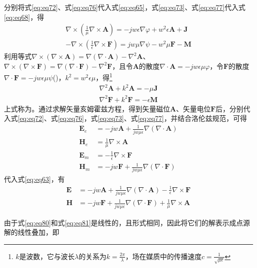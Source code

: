 \documentclass{article}
\numberwithin{equation}{section}
\begin{document}
分别将式\ref{eq:eq72}、式\ref{eq:eq76}代入式\ref{eq:eq65}，式\ref{eq:eq73}、式\ref{eq:eq77}代入式\ref{eq:eq68}，得
\begin{align}
    \label{eq:eq78}
    \nabla \times (\frac{1}{\mu}\nabla\times \mathbf{A})=-jw\epsilon \nabla \varphi+w^2\epsilon\mathbf{A}+\mathbf{J} \\
    \label{eq:eq79}
    -\nabla \times (\frac{1}{\epsilon}\nabla\times \mathbf{F})=jw\mu \nabla \psi-w^2\mu\mathbf{F}-\mathbf{M}
\end{align}
利用等式$\nabla\times(\nabla\times\mathbf{A})=\nabla(\nabla \cdot\mathbf{A})-\nabla^2\mathbf{A}$、$\nabla\times(\nabla\times\mathbf{F})=\nabla(\nabla \cdot\mathbf{F})-\nabla^2\mathbf{F}$，且令$\mathbf{A}$的散度$\nabla\cdot\mathbf{A}=-jw\epsilon\mu\varphi$，令$\mathbf{F}$的散度$\nabla\cdot\mathbf{F}=-jw\epsilon\mu\psi$(\textbf{\color{blue}{洛伦兹规范}})，$k^2=w^2\epsilon\mu$，得\footnote{$k$是波数，它与波长$\lambda$的关系为$k=\frac{2\pi}{\lambda}$，场在媒质中的传播速度$c=\frac{1}{\sqrt{\mu\epsilon}}$}
\begin{align}
    \label{eq:eq80}
    \nabla^2\mathbf{A}+k^2\mathbf{A}=-\mu\mathbf{J} \\
    \label{eq:eq81}
    \nabla^2\mathbf{F}+k^2\mathbf{F}=-\epsilon\mathbf{M}
\end{align}
上式称为\textbf{\color{blue}{矢量亥姆霍兹方程}}。通过求解矢量亥姆霍兹方程，得到矢量磁位$\mathbf{A}$、矢量电位$\mathbf{F}$后，分别代入式\ref{eq:eq72}、式\ref{eq:eq76}，式\ref{eq:eq73}、式\ref{eq:eq77}，并结合洛伦兹规范，可得
\begin{align}
    \mathbf{E}_e&=-jw\mathbf{A}+\frac{1}{jw\mu\epsilon}\nabla(\nabla \cdot \mathbf{A}) \\
    \mathbf{H}_e&=\frac{1}{\mu}\nabla\times\mathbf{A} \\
    \mathbf{E}_m&=-\frac{1}{\epsilon}\nabla\times\mathbf{F} \\
    \mathbf{H}_m&=-jw\mathbf{F}+\frac{1}{jw\mu\epsilon}\nabla(\nabla \cdot \mathbf{F})
\end{align}
代入式\ref{eq:eq63}，有
\begin{align}
    \label{eq:eq82}
    \mathbf{E}&=-jw\mathbf{A}+\frac{1}{jw\mu\epsilon}\nabla(\nabla \cdot \mathbf{A})-\frac{1}{\epsilon}\nabla\times\mathbf{F} \\
    \label{eq:eq83}
    \mathbf{H}&=-jw\mathbf{F}+\frac{1}{jw\mu\epsilon}\nabla(\nabla \cdot \mathbf{F})+\frac{1}{\mu}\nabla\times\mathbf{A}
\end{align}
\par
由于式\ref{eq:eq80}和式\ref{eq:eq81}是线性的，且形式相同，因此将它们的解表示成点源解的线性叠加，即
\end{document}
